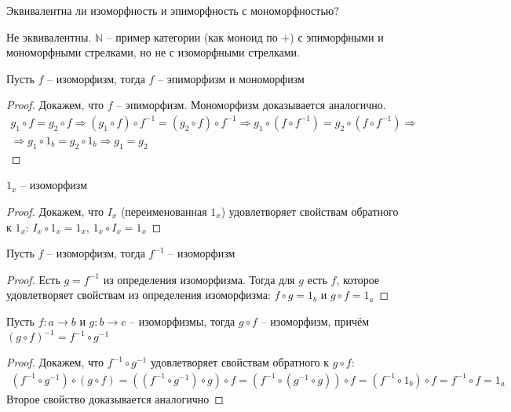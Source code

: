Эквивалентна ли изоморфность и эпиморфность с мономорфностью?
\begin{exm}
  Не эквивалентны. $\mathbb{N}$ -- пример категории (как моноид по $+$) с
  эпиморфными и мономорфными стрелками, но не с изоморфными стрелками.
\end{exm}

\begin{task}
  Пусть $f$ -- изоморфизм, тогда $f$ -- эпиморфизм и мономорфизм
\end{task}
\begin{proof}
  Докажем, что $f$ -- эпиморфизм. Мономорфизм доказывается аналогично.
  \begin{gather*}
    g_1 \circ f = g_2 \circ f \Rightarrow
    (g_1 \circ f) \circ f^{-1} = (g_2 \circ f) \circ f^{-1} \Rightarrow
    g_1 \circ (f \circ f^{-1}) = g_2 \circ (f \circ f^{-1}) \Rightarrow \\
    \Rightarrow g_1 \circ 1_b = g_2 \circ 1_b \Rightarrow
    g_1 = g_2
  \end{gather*}
\end{proof}

\begin{task}
  $1_x$ -- изоморфизм
\end{task}
\begin{proof}
  Докажем, что $I_x$ (переименованная $1_x$) удовлетворяет свойствам обратного к $1_x$:
  $I_x \circ 1_x = 1_x$, $1_x \circ I_x = 1_x$
\end{proof}

\begin{task}
  Пусть $f$ -- изоморфизм, тогда $f^{-1}$ -- изоморфизм
\end{task}
\begin{proof}
  Есть $g = f^{-1}$ из определения изоморфизма. Тогда для $g$ есть $f$, которое
  удовлетворяет свойствам из определения изоморфизма: $f \circ g = 1_b$ и
  $g \circ f = 1_a$
\end{proof}

\begin{task}
  Пусть $f \colon a \to b$ и $g \colon b \to c$ -- изоморфизмы, тогда $g \circ f$ -- изоморфизм, причём
  $(g \circ f)^{-1} = f^{-1} \circ g^{-1}$
\end{task}
\begin{proof}
  Докажем, что $f^{-1} \circ g^{-1}$ удовлетворяет свойствам обратного к
  $g \circ f$:
  \begin{gather*}
    (f^{-1} \circ g^{-1}) \circ (g \circ f) =
    ((f^{-1} \circ g^{-1}) \circ g) \circ f =
    (f^{-1} \circ (g^{-1} \circ g)) \circ f =
    (f^{-1} \circ 1_b) \circ f =
    f^{-1} \circ f = 1_a
  \end{gather*}
  Второе свойство доказывается аналогично
\end{proof}


